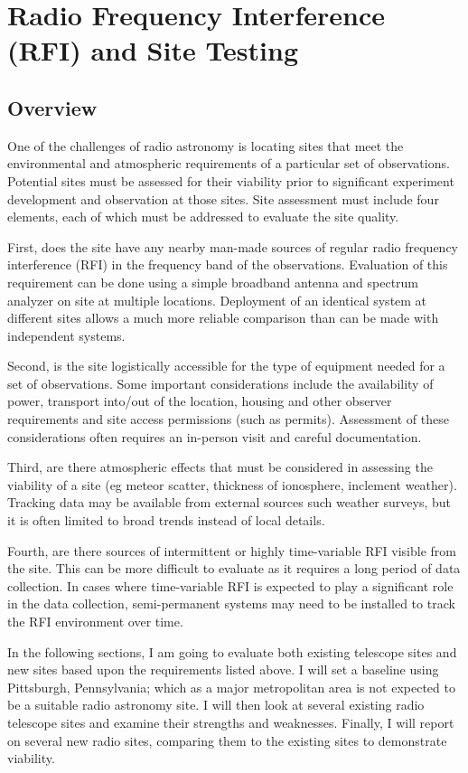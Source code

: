 \chapter{Radio Frequency Interference (RFI) and Site Testing}

\section{Overview}

One of the challenges of radio astronomy is locating sites that meet the environmental and atmospheric requirements of a particular set of observations. Potential sites must be assessed for their viability prior to significant experiment development and observation at those sites. Site assessment must include four elements, each of which must be addressed to evaluate the site quality. 

First, does the site have any nearby man-made sources of regular radio frequency interference (RFI) in the frequency band of the observations. Evaluation of this requirement can be done using a simple broadband antenna and spectrum analyzer on site at multiple locations. Deployment of an identical system at different sites allows a much more reliable comparison than can be made with independent systems. 

Second, is the site logistically accessible for the type of equipment needed for a set of observations. Some important considerations include the availability of power, transport into/out of the location, housing and other observer requirements and site access permissions (such as permits). Assessment of these considerations often requires an in-person visit and careful documentation. 

Third, are there atmospheric effects that must be considered in assessing the viability of a site (eg meteor scatter, thickness of ionosphere, inclement weather). Tracking data may be available from external sources such weather surveys, but it is often limited to broad trends instead of local details. 

Fourth, are there sources of intermittent or highly time-variable RFI visible from the site. This can be more difficult to evaluate as it requires a long period of data collection. In cases where time-variable RFI is expected to play a significant role in the data collection, semi-permanent systems may need to be installed to track the RFI environment over time. 

In the following sections, I am going to evaluate both existing telescope sites and new sites based upon the requirements listed above. I will set a baseline using Pittsburgh, Pennsylvania; which as a major metropolitan area is not expected to be a suitable radio astronomy site. I will then look at several existing radio telescope sites and examine their strengths and weaknesses. Finally, I will report on several new radio sites, comparing them to the existing sites to demonstrate viability. 

